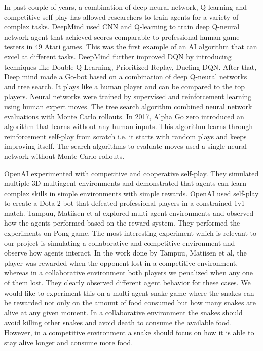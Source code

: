 \documentclass[conference,10pt]{IEEEtran}
\begin{document}
	In past couple of years, a combination of deep neural network, Q-learning and
	competitive self play has allowed researchers to train agents for a variety
	of complex tasks. DeepMind\cite{sp3} used CNN and Q-learning to train deep Q-neural
	network agent that achieved scores comparable to professional human game
	testers in 49 Atari games. This was the first example of an AI algorithm
	that can excel at different tasks. DeepMind further improved DQN by introducing
	techniques like Double Q Learning\cite{sp4}, Prioritized Replay\cite{sp5}, Dueling DQN\cite{sp6}.  After
	that, Deep mind made a Go-bot\cite{sp7} based on a combination of deep Q-neural
	networks and tree search. It plays like a human player and can be compared to the top players. Neural networks were trained by supervised and reinforcement learning using human
	expert moves. The tree search algorithm
	combined neural network evaluations with Monte Carlo rollouts. In 2017, Alpha
	Go zero\cite{sp8} introduced an algorithm that learns without any human inputs.
	This algorithm learns through reinforcement self-play from scratch i.e. it starts
	with random plays and keeps improving itself. The search algorithms to evaluate moves used a single
	neural network without Monte Carlo rollouts.

	OpenAI experimented with competitive and cooperative self-play\cite{sp9}. They simulated
	multiple 3D-multiagent environments and demonstrated that agents can learn
	complex skills in simple environments with simple rewards. OpenAI\cite{sp10} used
	self-play to create a Dota 2 bot that defeated professional players in a
	constrained 1v1 match.
	\break
	\break
	Tampuu, Matiisen et al\cite{sd7} explored multi-agent environments and observed how the agents performed based on the reward system. They performed the experiments on Pong game. The most interesting experiment which is relevant to our project is simulating a collaborative and competitive environment and observe how agents interact. In the work done by Tampuu, Matiisen et al\cite{sd3}, the player was rewarded when the opponent lost in a competitive environment, whereas in a collaborative environment both players we penalized when any one of them lost. They clearly observed different agent behavior for these cases.
	\break
	\break
	We would like to experiment this on a multi-agent snake game where the snakes can be rewarded not only on the amount of food consumed but how many snakes are alive at any given moment. In a collaborative environment the snakes should avoid killing other snakes and avoid death to consume the available food. However, in a competitive environment a snake should focus on how it is able to stay alive longer and consume more food.
\end{document}

